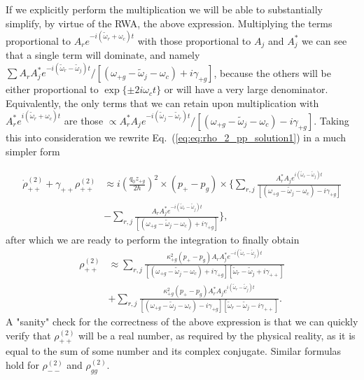 \documentclass[preprint,secnumarabic,amssymb, nobibnotes, aip, prd]{revtex4-1}
\def\tw{\tilde{\omega}}
\def\tw{\tilde{\omega}}
\begin{document}
	If we explicitly perform the multiplication we will be able to substantially simplify, by virtue of the RWA, the above expression. Multiplying the terms proportional to $A_re^{-i(\tw_r+\omega_c)t}$ with those proportional to $A_j$ and $A_j^*$ we can see that a single term will dominate, and namely $\sum A_rA_j^*e^{-i(\tw_r-\tw_j)t}/[( \omega_{+ g} - \tw_j-\omega_c) +i\gamma_{+ g}]$, because the others will be either proportional to $\exp\{\pm 2i\omega_c t\}$ or will have a very large denominator. Equivalently, the only terms that we can retain upon multiplication with $A_r^*e^{i(\tw_r+\omega_c)t}$ are those $\propto A_r^*A_je^{-i(\tw_j-\tw_r)t}/[( \omega_{+ g} - \tw_j-\omega_c) -i\gamma_{+ g}]$. Taking this into consideration we rewrite Eq.~(\ref{eq:eq:rho_2_pp_solution1}) in a much simpler form
	
	\begin{align}
	\dot{\rho}_{++}^{(2)} +\gamma_{++}\rho_{++}^{(2)} &\approx i\left(\frac{q_0z_{+g}}{2\hbar}\right)^2\times (p_+-p_g) \times 
	\Big \{
	\sum_{r,j} \frac{A_r^*A_je^{i(\tw_r-\tw_j)t}}{[( \omega_{+ g} - \tw_j-\omega_c) -i\gamma_{+ g}]} \nonumber \\
	&- \sum_{r,j} \frac{A_rA_j^*e^{-i(\tw_r-\tw_j)t}}{[( \omega_{+ g} - \tw_j-\omega_c) +i\gamma_{+ g}]}
	\Big \},
	\end{align}
	after which we are ready to perform the integration to finally obtain
	\begin{align}
	\rho_{++}^{(2)} &\approx 
	\sum_{r,j} \frac{\kappa_{+g}^2 (p_+-p_g) A_rA_j^*e^{-i(\tw_r-\tw_j)t}}{[( \omega_{+ g} - \tw_j-\omega_c) +i\gamma_{+ g}][ \tw_r-\tw_j +i\gamma_{++}]} \nonumber \\
	& + \sum_{r,j} \frac{\kappa_{+g}^2 (p_+-p_g) A_r^*A_je^{i(\tw_r-\tw_j)t}}{[( \omega_{+ g} - \tw_j-\omega_c) -i\gamma_{+ g}][ \tw_r-\tw_j -i\gamma_{++}]}
.	\end{align}
	A "sanity" check for the correctness of the above expression is that we can quickly verify that $\rho_{++}^{(2)}$ will be a real number, as required by the physical reality, as it is equal to the sum of some number and its complex conjugate. Similar formulas hold for $\rho_{--}^{(2)}$ and $\rho_{gg}^{(2)}$.
	
\end{document}

